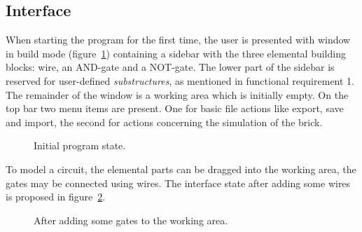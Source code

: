 \subsection{Interface} %



When starting the program for the first time, the user is presented with window in build mode (figure~\ref{fig-interface-empty}) containing a sidebar with the three elemental building blocks: wire, an AND-gate and a NOT-gate. The lower part of the sidebar is reserved for user-defined \textit{substructures}, as mentioned in functional requirement 1.
The remainder of the window is a working area which is initially empty.
On the top bar two menu items are present. One for basic file actions like export, save and import, the second for actions concerning the simulation of the brick.

\begin{figure}[h!]
	\caption{Initial program state.}
	\label{fig-interface-empty}
	\centering{}
\end{figure}

\noindent To model a circuit, the elemental parts can be dragged into the working area, the gates may be connected using wires. The interface state after adding some wires is proposed in figure~\ref{fig-interface-building}.

\begin{figure}[h!]
	\caption{After adding some gates to the working area.}
	\label{fig-interface-building}
	\centering
\end{figure}

